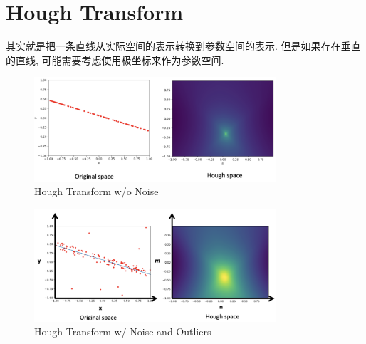 \newpage
\section{Hough Transform}

其实就是把一条直线从实际空间的表示转换到参数空间的表示. 但是如果存在垂直的直线, 可能需要考虑使用极坐标来作为参数空间.

\begin{figure}[htbp]
    \centering
    \includegraphics[width=0.8\textwidth]{figures/hough1.png}
    \caption{Hough Transform w/o Noise}
\end{figure}

\begin{figure}[htbp]
    \centering
    \includegraphics[width=0.8\textwidth]{figures/hough2.png}
    \caption{Hough Transform w/ Noise and Outliers}
\end{figure}